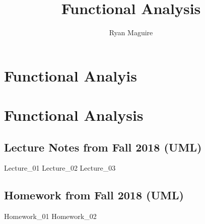 \documentclass[crop=false,class=book,oneside]{standalone}
\begin{document}
    \newif\ifmathcoursesfunctional
    \ifx\ifmathcourses\undefined
        \title{Functional Analysis}
        \author{Ryan Maguire}
        \date{\vspace{-5ex}}
        \maketitle
        \tableofcontents
        \clearpage
        \chapter*{Functional Analyis}
        \setcounter{chapter}{1}
    \else
        \chapter{Functional Analysis}
    \fi
    \section{Lecture Notes from Fall 2018 (UML)}
        {Lecture_01}
        {Lecture_02}
        {Lecture_03}
    \newpage
    \section{Homework from Fall 2018 (UML)}
        {Homework_01}
        {Homework_02}
\end{document}
